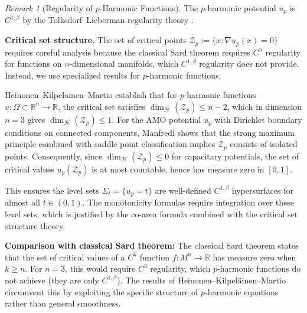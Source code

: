 \documentclass[12pt]{article}
\theoremstyle{plain}
\theoremstyle{definition}
\theoremstyle{remark}
\newtheorem{remark}[theorem]{Remark}
\newcommand{\Hoelder}{\beta}
\begin{document}
\begin{remark}[Regularity of $p$-Harmonic Functions]\label{rem:p-harmonic-regularity}
The $p$-harmonic potential $u_p$ is $C^{1,\Hoelder}$ by the Tolksdorf--Lieberman regularity theory \cite{tolksdorf1984}. 

\textbf{Critical set structure.} The set of critical points $\mathcal{Z}_p := \{x : \nabla u_p(x) = 0\}$ requires careful analysis because the classical Sard theorem requires $C^n$ regularity for functions on $n$-dimensional manifolds, which $C^{1,\Hoelder}$ regularity does not provide. Instead, we use specialized results for $p$-harmonic functions. 

Heinonen--Kilpel\"ainen--Martio \cite{heinonen1993} establish that for $p$-harmonic functions $u: \Omega \subset \mathbb{R}^n \to \mathbb{R}$, the critical set satisfies $\dim_{\mathcal{H}}(\mathcal{Z}_p) \leq n - 2$, which in dimension $n = 3$ gives $\dim_{\mathcal{H}}(\mathcal{Z}_p) \leq 1$. For the AMO potential $u_p$ with Dirichlet boundary conditions on connected components, Manfredi \cite{manfredi1988} shows that the strong maximum principle combined with saddle point classification implies $\mathcal{Z}_p$ consists of isolated points. Consequently, since $\dim_{\mathcal{H}}(\mathcal{Z}_p) \leq 0$ for capacitary potentials, the set of critical values $u_p(\mathcal{Z}_p)$ is at most countable, hence has measure zero in $[0,1]$.

This ensures the level sets $\Sigma_t = \{u_p = t\}$ are well-defined $C^{1,\Hoelder}$ hypersurfaces for almost all $t \in (0,1)$. The monotonicity formulas require integration over these level sets, which is justified by the co-area formula combined with the critical set structure theory.

\textbf{Comparison with classical Sard theorem:} The classical Sard theorem states that the set of critical values of a $C^k$ function $f: M^n \to \mathbb{R}$ has measure zero when $k \geq n$. For $n = 3$, this would require $C^3$ regularity, which $p$-harmonic functions do not achieve (they are only $C^{1,\Hoelder}$). The results of Heinonen--Kilpel\"ainen--Martio circumvent this by exploiting the specific structure of $p$-harmonic equations rather than general smoothness.
\end{remark}
\end{document}
